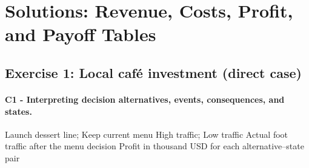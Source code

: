 	\newpage
	\newpage
	\section{Solutions: Revenue, Costs, Profit, and Payoff Tables}
	\label{sec:solutions-extraction}


	\subsection{Exercise 1: Local caf\'e investment (direct case)}
	\label{sec:problem1-local-cafe-c1-c3}
	\paragraph*{C1 - Interpreting decision alternatives, events, consequences, and states.}
	\DecisionElementsTable
	{Launch dessert line; Keep current menu}
	{High traffic; Low traffic}
	{Actual foot traffic after the menu decision}
	{Profit in thousand USD for each alternative--state pair}

